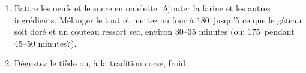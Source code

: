
\begin{ingredients}
\end{ingredients}


\begin{recipe}
  \begin{enumerate}

  \item Battre les oeufs et le sucre en omelette.  Ajouter la farine
    et les autres ingr\'edients.  M\'elanger le tout et mettez au four
    \`a 180\degreeC\ jusqu'\`a ce que le g\^ateau soit dor\'e et un couteau
    ressort sec, environ 30--35 minutes (ou: 175\degreeC\ pendant 45--50 minutes?).

  \item D\'egustez le ti\`ede ou, \`a la tradition corse, froid.

  \end{enumerate}
\end{recipe}


